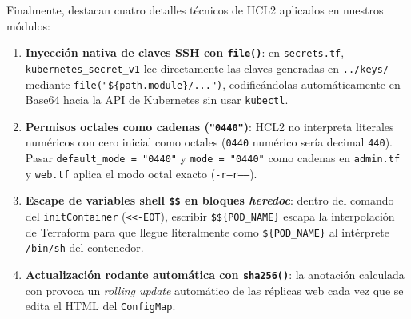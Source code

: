 Finalmente, destacan cuatro detalles técnicos de HCL2 aplicados en nuestros módulos:
\begin{enumerate}
  \item \textbf{Inyección nativa de claves SSH con \texttt{file()}}: en \texttt{secrets.tf}, \texttt{kubernetes\_secret\_v1} lee directamente las claves generadas en \texttt{../keys/} mediante \texttt{file("\$\{path.module\}/...")}, codificándolas automáticamente en Base64 hacia la API de Kubernetes sin usar \texttt{kubectl}.
  \item \textbf{Permisos octales como cadenas (\texttt{"0440"})}: HCL2 no interpreta literales numéricos con cero inicial como octales (\texttt{0440} numérico sería decimal \texttt{440}). Pasar \texttt{default\_mode = "0440"} y \texttt{mode = "0440"} como cadenas en \texttt{admin.tf} y \texttt{web.tf} aplica el modo octal exacto (\texttt{-r--r-----}).
  \item \textbf{Escape de variables shell \texttt{\$\$} en bloques \textit{heredoc}}: dentro del comando del \texttt{initContainer} (\texttt{<<-EOT}), escribir \texttt{\$\$\{POD\_NAME\}} escapa la interpolación de Terraform para que llegue literalmente como \texttt{\$\{POD\_NAME\}} al intérprete \texttt{/bin/sh} del contenedor.
  \item \textbf{Actualización rodante automática con \texttt{sha256()}}: la anotación  calculada con  provoca un \textit{rolling update} automático de las réplicas web cada vez que se edita el HTML del \texttt{ConfigMap}.
\end{enumerate}
